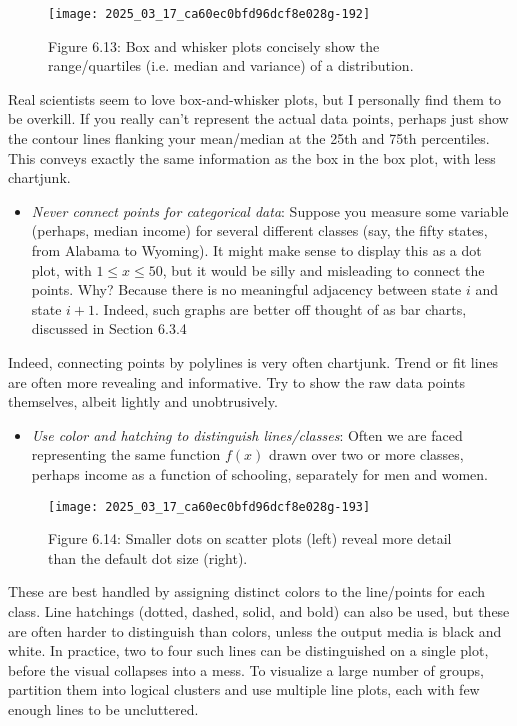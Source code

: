\documentclass[10pt]{article}
\begin{document}
\begin{itemize}
\end{itemize}

\begin{figure}[h!]
\centering
\texttt{[image: 2025\_03\_17\_ca60ec0bfd96dcf8e028g-192]}
\caption{Figure 6.13: Box and whisker plots concisely show the range/quartiles (i.e. median and variance) of a distribution.}
\end{figure}

Real scientists seem to love box-and-whisker plots, but I personally find them to be overkill. If you really can't represent the actual data points, perhaps just show the contour lines flanking your mean/median at the 25th and 75th percentiles. This conveys exactly the same information as the box in the box plot, with less chartjunk.

\begin{itemize}
  \item \textit{Never connect points for categorical data}: Suppose you measure some variable (perhaps, median income) for several different classes (say, the fifty states, from Alabama to Wyoming). It might make sense to display this as a dot plot, with \(1 \leq x \leq 50\), but it would be silly and misleading to connect the points. Why? Because there is no meaningful adjacency between state \(i\) and state \(i+1\). Indeed, such graphs are better off thought of as bar charts, discussed in Section 6.3.4
\end{itemize}

Indeed, connecting points by polylines is very often chartjunk. Trend or fit lines are often more revealing and informative. Try to show the raw data points themselves, albeit lightly and unobtrusively.

\begin{itemize}
  \item \textit{Use color and hatching to distinguish lines/classes}: Often we are faced representing the same function \(f(x)\) drawn over two or more classes, perhaps income as a function of schooling, separately for men and women.
\end{itemize}

\begin{figure}[h!]
\centering
\texttt{[image: 2025\_03\_17\_ca60ec0bfd96dcf8e028g-193]}
\caption{Figure 6.14: Smaller dots on scatter plots (left) reveal more detail than the default dot size (right).}
\end{figure}

These are best handled by assigning distinct colors to the line/points for each class. Line hatchings (dotted, dashed, solid, and bold) can also be used, but these are often harder to distinguish than colors, unless the output media is black and white. In practice, two to four such lines can be distinguished on a single plot, before the visual collapses into a mess. To visualize a large number of groups, partition them into logical clusters and use multiple line plots, each with few enough lines to be uncluttered.
\end{document}
